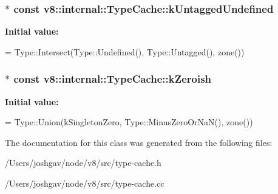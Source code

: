 \subsubsection[{\texorpdfstring{k\+Untagged\+Undefined}{kUntaggedUndefined}}]{$\ast$ const v8\+::internal\+::\+Type\+Cache\+::k\+Untagged\+Undefined}\hypertarget{classv8_1_1internal_1_1_type_cache_a6889f7166e0029a9c7eafcfe73bd3b6c}{}\label{classv8_1_1internal_1_1_type_cache_a6889f7166e0029a9c7eafcfe73bd3b6c}
{\bfseries Initial value\+:}
\begin{DoxyCode}
=
      Type::Intersect(Type::Undefined(), Type::Untagged(), zone())
\end{DoxyCode}
\subsubsection[{\texorpdfstring{k\+Zeroish}{kZeroish}}]{$\ast$ const v8\+::internal\+::\+Type\+Cache\+::k\+Zeroish}\hypertarget{classv8_1_1internal_1_1_type_cache_a957dd93677d06661aa01173decb90c4f}{}\label{classv8_1_1internal_1_1_type_cache_a957dd93677d06661aa01173decb90c4f}
{\bfseries Initial value\+:}
\begin{DoxyCode}
=
      Type::Union(kSingletonZero, Type::MinusZeroOrNaN(), zone())
\end{DoxyCode}


The documentation for this class was generated from the following files\+:\begin{DoxyCompactItemize}
\item 
/\+Users/joshgav/node/v8/src/type-\/cache.\+h\item 
/\+Users/joshgav/node/v8/src/type-\/cache.\+cc\end{DoxyCompactItemize}
